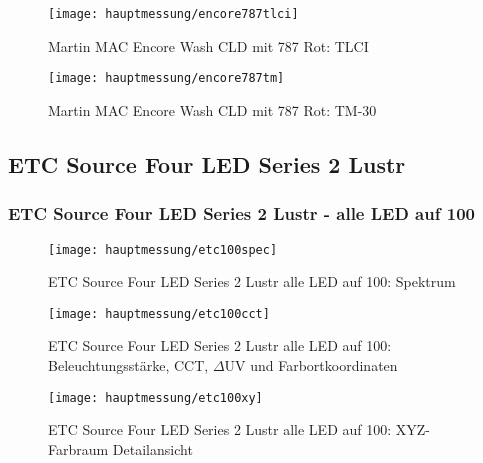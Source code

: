 \documentclass[pagesize,paper=A4,fontsize=12pt,utf8,numbers=noenddot,bibliography=totoc,listof=totoc,DIV=11,BCOR=1mm]{scrreprt}
\begin{document}
\begin{figure}[htp]     %
\centering
\texttt{[image: hauptmessung/encore787tlci]} 
\caption {Martin MAC Encore Wash CLD mit 787 Rot: TLCI} 
\end{figure}

\begin{figure}[htp]     %
\centering
\texttt{[image: hauptmessung/encore787tm]} 
\caption {Martin MAC Encore Wash CLD mit 787 Rot: TM-30} 
\end{figure}


\subsection{ETC Source Four LED Series 2 Lustr}

\subsubsection{ETC Source Four LED Series 2 Lustr - alle LED auf 100}

\begin{figure}[htp]     %
\centering
\texttt{[image: hauptmessung/etc100spec]} 
\caption {ETC Source Four LED Series 2 Lustr alle LED auf 100: Spektrum} 
\end{figure}

\begin{figure}[htp]     %
\centering
\texttt{[image: hauptmessung/etc100cct]} 
\caption {ETC Source Four LED Series 2 Lustr alle LED auf 100: Beleuchtungsstärke, CCT, $\Delta$UV und Farbortkoordinaten} 
\end{figure}

\begin{figure}[htp]     %
\centering
\texttt{[image: hauptmessung/etc100xy]} 
\caption {ETC Source Four LED Series 2 Lustr alle LED auf 100: XYZ-Farbraum Detailansicht} 
\end{figure}
\end{document}

